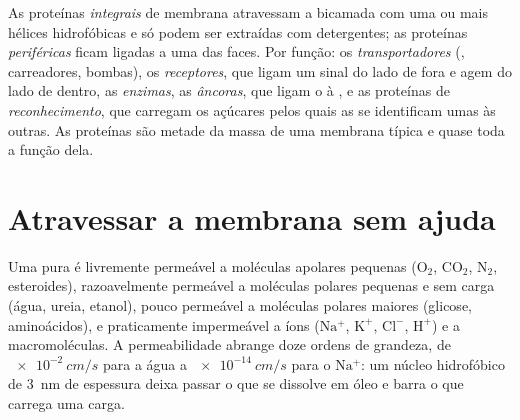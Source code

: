 \begin{definition}\label{def:b1:membranes-transport:proteins}
As proteínas \emph{integrais} de membrana
atravessam a bicamada com uma ou mais hélices hidrofóbicas e só podem
ser extraídas com detergentes; as proteínas \emph{periféricas} ficam
ligadas a uma das faces. Por função: os \emph{transportadores} (,
carreadores, bombas), os \emph{receptores}, que ligam um sinal do lado
de fora e agem do lado de dentro, as \emph{enzimas}, as
\emph{âncoras}, que ligam o  à , e as
proteínas de \emph{reconhecimento}, que carregam os açúcares pelos quais
as  se identificam umas às outras. As proteínas são metade da
massa de uma membrana típica e quase toda a função dela.
\end{definition}

\section{Atravessar a membrana sem ajuda}

\begin{proposition}\label{prop:b1:membranes-transport:permeability}
Uma  pura é livremente permeável a moléculas apolares
pequenas ($\mathrm{O_2}$, $\mathrm{CO_2}$, $\mathrm{N_2}$, esteroides),
razoavelmente permeável a moléculas polares pequenas e sem carga (água,
ureia, etanol), pouco permeável a moléculas polares maiores (glicose,
aminoácidos), e praticamente impermeável a íons ($\mathrm{Na^+}$,
$\mathrm{K^+}$, $\mathrm{Cl^-}$, $\mathrm{H^+}$) e a macromoléculas. A
permeabilidade abrange doze ordens de grandeza, de $\qty{e-2}{cm/s}$
para a água a $\qty{e-14}{cm/s}$ para o $\mathrm{Na^+}$: um núcleo
hidrofóbico de \qty{3}{nm} de espessura deixa passar o que se dissolve
em óleo e barra o que carrega uma carga.
\end{proposition}

